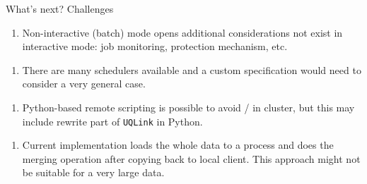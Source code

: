 \documentclass{rsuqbeamernew}
\begin{document}
\begin{frame}[t]{What's next? Challenges}
	\small
  \begin{enumerate}
    \item[] Non-interactive (batch) mode opens additional considerations not
    exist in interactive mode: job monitoring, protection mechanism, etc.
  \end{enumerate}
  
  \begin{enumerate}
    \item[] There are many schedulers available and a custom specification would
    need to consider a very general case.
  \end{enumerate}
      
  \begin{enumerate}
    \item[] Python-based remote scripting is possible to avoid \matlab/\uqlab{}
    in cluster, {\altx but this may include rewrite part of \texttt{UQLink} in
    Python}.
  \end{enumerate}
    
  \begin{enumerate}
    \item[] Current implementation loads the whole data to a process and does
    the merging operation after copying back to local client.
    {\altx This approach might not be suitable for a very large data.}
  \end{enumerate}
\end{frame}
\end{document}
